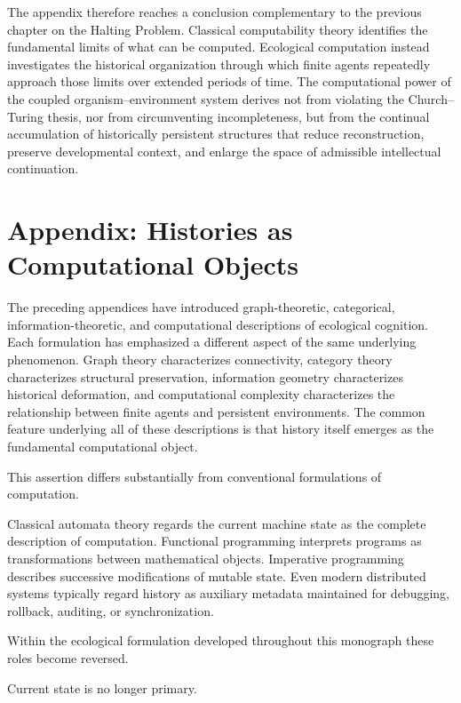 \documentclass[12pt,oneside]{article}
\theoremstyle{remark}
\begin{document}
The appendix therefore reaches a conclusion complementary to the previous
chapter on the Halting Problem. Classical computability theory identifies the
fundamental limits of what can be computed. Ecological computation instead
investigates the historical organization through which finite agents repeatedly
approach those limits over extended periods of time. The computational power of
the coupled organism--environment system derives not from violating the
Church--Turing thesis, nor from circumventing incompleteness, but from the
continual accumulation of historically persistent structures that reduce
reconstruction, preserve developmental context, and enlarge the space of
admissible intellectual continuation.

\section{Appendix: Histories as Computational Objects}

The preceding appendices have introduced graph-theoretic, categorical,
information-theoretic, and computational descriptions of ecological cognition.
Each formulation has emphasized a different aspect of the same underlying
phenomenon. Graph theory characterizes connectivity, category theory
characterizes structural preservation, information geometry characterizes
historical deformation, and computational complexity characterizes the
relationship between finite agents and persistent environments. The common
feature underlying all of these descriptions is that history itself emerges as
the fundamental computational object.

This assertion differs substantially from conventional formulations of
computation.

Classical automata theory regards the current machine state as the complete
description of computation. Functional programming interprets programs as
transformations between mathematical objects. Imperative programming describes
successive modifications of mutable state. Even modern distributed systems
typically regard history as auxiliary metadata maintained for debugging,
rollback, auditing, or synchronization.

Within the ecological formulation developed throughout this monograph these
roles become reversed.

Current state is no longer primary.
\end{document}
